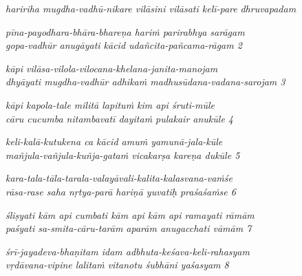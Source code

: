\begin{myquote}
\textit{haririha mugdha-vadhū-nikare vilāsini vilāsati kelī-pare } \textit{dhruvapadam }
\end{myquote}

\begin{myquote}
\textit{pīna-payodhara-bhāra-bhareṇa hariṁ parirabhya sarāgam }\\ \textit{gopa-vadhūr anugāyati kācid udañcita-pañcama-rāgam  2 }
\end{myquote}

\begin{myquote}
\textit{kāpi vilāsa-vilola-vilocana-khelana-janita-manojam }\\ \textit{dhyāyati mugdha-vadhūr adhikaṁ madhusūdana-vadana-sarojam  3 }
\end{myquote}

\begin{myquote}
\textit{kāpi kapola-tale militā lapituṁ kim api śruti-mūle } \\ \textit{cāru cucumba nitambavatī dayitaṁ pulakair anukūle  4 }
\end{myquote}

\begin{myquote}
\textit{keli-kalā-kutukena ca kācid amuṁ yamunā-jala-kūle } \\ \textit{mañjula-vañjula-kuñja-gataṁ vicakarṣa kareṇa dukūle  5 }
\end{myquote}

\begin{myquote}
\textit{kara-tala-tāla-tarala-valayāvali-kalita-kalasvana-vaṁśe } \\ \textit{rāsa-rase saha nṛtya-parā hariṇā yuvatiḥ praśaśaṁse  6 }
\end{myquote}

\begin{myquote}
\textit{śliṣyati kām api cumbati kām api kām api ramayati rāmām } \\ \textit{paśyati sa-smita-cāru-tarām aparām anugacchati vāmām  7 }
\end{myquote}

\begin{myquote}
\textit{śrī-jayadeva-bhaṇitam idam adbhuta-keśava-keli-rahasyam } \\ \textit{vṛdāvana-vipine lalitaṁ vitanotu śubhāni yaśasyam  8 }
\end{myquote}

